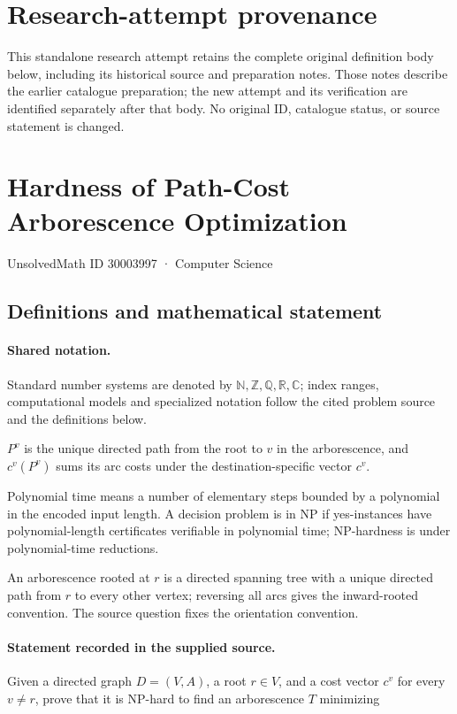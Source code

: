 \documentclass[11pt]{article}
\begin{document}
\section*{Research-attempt provenance}
This standalone research attempt retains the complete original definition body below,
including its historical source and preparation notes. Those notes describe the
earlier catalogue preparation; the new attempt and its verification are identified
separately after that body. No original ID, catalogue status, or source statement is changed.

\section{Hardness of Path-Cost Arborescence Optimization}\label{30003997}
{\small UnsolvedMath ID 30003997 · Computer Science}
\subsection{Definitions and mathematical statement}

\paragraph{Shared notation.}Standard number systems are denoted by $\mathbb N,\mathbb Z,\mathbb Q,\mathbb R,\mathbb C$; index ranges, computational models and specialized notation follow the cited problem source and the definitions below.


$P^v$ is the unique directed path from the root to $v$ in the arborescence, and $c^v(P^v)$ sums its arc costs under the destination-specific vector $c^v$.

Polynomial time means a number of elementary steps bounded by a polynomial in the encoded input length. A decision problem is in $\mathrm{NP}$ if yes-instances have polynomial-length certificates verifiable in polynomial time; NP-hardness is under polynomial-time reductions.

An arborescence rooted at $r$ is a directed spanning tree with a unique directed path from $r$ to every other vertex; reversing all arcs gives the inward-rooted convention. The source question fixes the orientation convention.
\paragraph{Statement recorded in the supplied source.}
Given a directed graph $D=(V,A)$, a root $r\in V$, and a cost vector $c^v$ for every $v\neq r$, prove that it is NP-hard to find an arborescence $T$ minimizing
\end{document}
